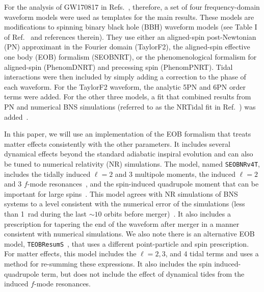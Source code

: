 \documentclass[prd,aps,letter,twocolumn,floatfix,notitlepage,nofootinbib]{revtex4-1}
\begin{document}
For the analysis of GW170817 in Refs.~\cite{BNSPE, O2Catalog}, therefore, a set of four frequency-domain waveform models were used as templates for the main results. These models are modifications to spinning binary black hole (BBH) waveform models (see Table I of Ref.~\cite{BNSPE} and references therein). They use either an aligned-spin post-Newtonian (PN) approximant in the Fourier domain (TaylorF2), the aligned-spin effective one body (EOB) formalism (SEOBNRT), or the phenomenological formalism for aligned-spin (PhenomDNRT) and precessing spin (PhenomPNRT). Tidal interactions were then included by simply adding a correction to the phase of each waveform. For the TaylorF2 waveform, the analytic 5PN and 6PN order terms were added. For the other three models, a fit that combined results from PN and numerical BNS simulations (referred to as the NRTidal fit in Ref.~\cite{BNSPE}) was added~\cite{DietrichBernuzziTichy2017}.

In this paper, we will use an implementation of the EOB formalism that treats matter effects consistently with the other parameters. It includes several dynamical effects beyond the standard adiabatic inspiral evolution and can also be tuned to numerical relativity (NR) simulations. The model, named \texttt{SEOBNRv4T}, includes the tidally induced $\ell=2$ and 3 multipole moments, the induced $\ell=2$ and 3 $f$-mode resonances~\cite{Hinderer:2016eia,Steinhoff:2016rfi}, and the spin-induced quadrupole moment that can be important for large spins~\cite{Poisson1998, HarryHinderer2018}. This model agrees with NR simulations of BNS systems to a level consistent with the numerical error of the simulations (less than 1~rad during the last $\sim 10$ orbits before merger)~\cite{DietrichHinderer2017, KiuchiKawaguchiKyutoku2017}. It also includes a prescription for tapering the end of the waveform after merger in a manner consistent with numerical simulations. We also note there is an alternative EOB model, \texttt{TEOBResumS}~\cite{NagarBernuzziDelpozzo2018, NagarMessinaRettegno2018}, that uses a different point-particle and spin prescription. For matter effects, this model includes the $\ell = 2, 3$, and 4 tidal terms and uses a method for re-summing these expressions. It also includes the spin induced-quadrupole term, but does not include the effect of dynamical tides from the induced $f$-mode resonances. 
\end{document}
